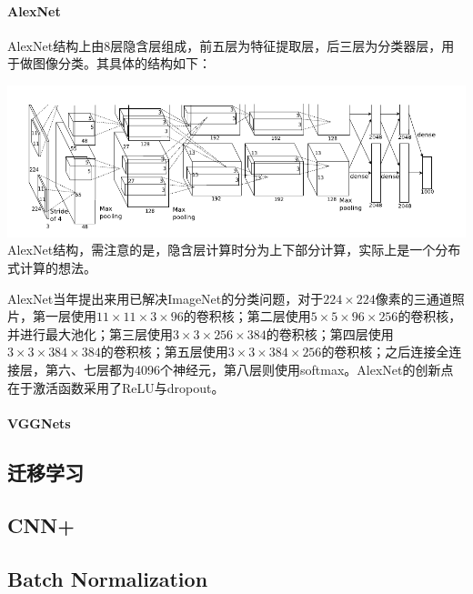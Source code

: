 \paragraph{AlexNet}AlexNet结构上由8层隐含层组成，前五层为特征提取层，后三层为分类器层，用于做图像分类。其具体的结构如下：
\begin{center}
\includegraphics[scale=0.6]{../figures/AlexNet.png} \\
AlexNet结构，需注意的是，隐含层计算时分为上下部分计算，实际上是一个分布式计算的想法。
\end{center}
AlexNet当年提出来用已解决ImageNet的分类问题，对于$224\times224$像素的三通道照片，第一层使用$11\times11\times3\times96$的卷积核；第二层使用$5\times5\times96\times256$的卷积核，并进行最大池化；第三层使用$3\times3\times256\times384$的卷积核；第四层使用$3\times3\times384\times384$的卷积核；第五层使用$3\times3\times384\times256$的卷积核；之后连接全连接层，第六、七层都为4096个神经元，第八层则使用softmax。AlexNet的创新点在于激活函数采用了ReLU与dropout。
\paragraph{VGGNets}
\subsection{迁移学习}
\subsection{CNN+}



\subsection{Batch Normalization}


